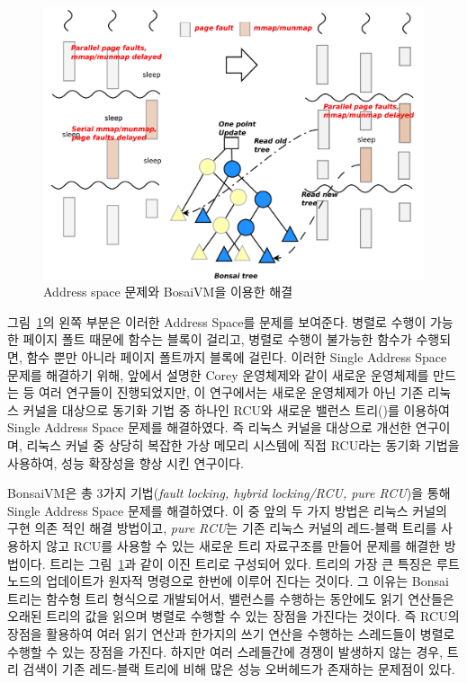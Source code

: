 \begin{figure}[h!]
    \centering
    \includegraphics[width=1\textwidth]{fig/bosaivm/bosaivm}
    \caption{Address space 문제와 BosaiVM을 이용한 해결}
  \label{fig:bonsaivm}
\end{figure}

그림~\ref{fig:bonsaivm}의 왼쪽 부분은 이러한 Address Space를 문제를 보여준다. 
병렬로 수행이 가능한 페이지 폴트 때문에  함수는 블록이 걸리고, 병렬로 
수행이 불가능한  함수가 수행되면,  함수 뿐만 아니라 
페이지 폴트까지 블록에 걸린다.
이러한 Single Address Space 문제를 해결하기 위해, 앞에서 설명한 Corey 운영체제와 같이 새로운 운영체제를 
만드는 등 여러 연구들이 진행되었지만, 이 연구에서는 새로운 운영체제가 아닌 기존 리눅스 커널을 대상으로 
동기화 기법 중 하나인 RCU와 새로운 밸런스 트리()를 이용하여 Single Address Space 문제를
해결하였다.
즉 리눅스 커널을 대상으로 개선한 연구이며, 
리눅스 커널 중 상당히 복잡한 가상 메모리 시스템에 직접 RCU라는 동기화 기법을 사용하여, 
성능 확장성을 향상 시킨 연구이다.
 
BonsaiVM은 총 3가지 기법(\textit{fault locking, hybrid locking/RCU, pure RCU})을 통해
Single Address Space 문제를 해결하였다.
이 중 앞의 두 가지 방법은 리눅스 커널의 구현 의존 적인 해결 방법이고, \textit{pure RCU}는 
기존 리눅스 커널의 레드-블랙 트리를 사용하지 않고 RCU를 사용할 수 있는 
새로운  트리 자료구조를 만들어 문제를 해결한 방법이다. 
 트리는 그림~\ref{fig:bonsaivm}과 같이 이진 트리로 구성되어 있다. 
 트리의 가장 큰 특징은 루트 노드의 업데이트가 원자적 명령으로 한번에 이루어 진다는 것이다. 
그 이유는 Bonsai 트리는 함수형 트리 형식으로 개발되어서, 밸런스를 수행하는 동안에도 읽기 연산들은 
오래된 트리의 값을 읽으며 병렬로 수행할 수 있는 장점을 가진다는 것이다.
즉 RCU의 장점을 활용하여 여러 읽기 연산과 한가지의 쓰기 연산을 수행하는 스레드들이 병렬로 수행할 수 
있는 장점을 가진다. 
하지만 여러 스레들간에 경쟁이 발생하지 않는 경우, 트리 검색이 기존 레드-블랙 트리에 비해 많은 성능 
오버헤드가 존재하는 문제점이 있다. 
 
